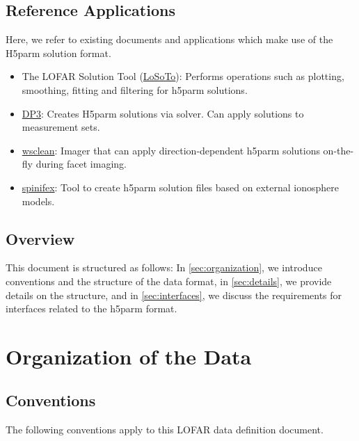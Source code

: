 \documentclass[a4paper,10pt,bibtotoc]{scrartcl}
\begin{document}
\subsection{Reference Applications}
Here, we refer to existing documents and applications which make use of the H5parm solution format.
\begin{itemize}
  \item The LOFAR Solution Tool (\href{https://github.com/revoltek/losoto}{LoSoTo}): Performs operations such as plotting, smoothing, fitting and filtering for h5parm solutions. 
  \item \href{https://dp3.readthedocs.io/en/latest/steps/DDECal.html}{DP3}: Creates H5parm solutions via solver. Can apply solutions to measurement sets.
  \item \href{https://wsclean.readthedocs.io/en/latest/}{wsclean}: Imager that can apply direction-dependent h5parm solutions on-the-fly during facet imaging.
  \item \href{https://git.astron.nl/RD/spinifex}{spinifex}: Tool to create h5parm solution files based on external ionosphere models.

\end{itemize}

 \subsection{Overview}

This document is structured as follows: In \autoref{sec:organization}, we introduce conventions and the structure of the data format, in \autoref{sec:details}, we provide details on the structure, and in \autoref{sec:interfaces}, we discuss the requirements for interfaces related to the h5parm format.

\section{Organization of the Data}\label{sec:organization}

\subsection{Conventions}
The following conventions apply to this LOFAR data definition document.
\end{document}
